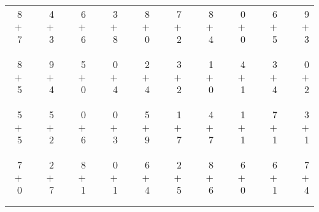 \documentclass[12pt, letterpaper]{article}
\begin{document}
\begin{tabular}{rrrrrrrrrrrrrrrrrrr}
8 & & 4 & & 6 & & 3 & & 8 & & 7 & & 8 & & 0 & & 6 & & 9\\
$+$ 7 & & $+$ 3 & & $+$ 6 & & $+$ 8 & & $+$ 0 & & $+$ 2 & & $+$ 4 & & $+$ 0 & & $+$ 5 & & $+$ 3\\
\cline{1-1} \cline{3-3} \cline{5-5} \cline{7-7} \cline{9-9} \cline{11-11} \cline{13-13} \cline{15-15} \cline{17-17} \cline{19-19} \\ \\
8 & & 9 & & 5 & & 0 & & 2 & & 3 & & 1 & & 4 & & 3 & & 0\\
$+$ 5 & & $+$ 4 & & $+$ 0 & & $+$ 4 & & $+$ 4 & & $+$ 2 & & $+$ 0 & & $+$ 1 & & $+$ 4 & & $+$ 2\\
\cline{1-1} \cline{3-3} \cline{5-5} \cline{7-7} \cline{9-9} \cline{11-11} \cline{13-13} \cline{15-15} \cline{17-17} \cline{19-19} \\ \\
5 & & 5 & & 0 & & 0 & & 5 & & 1 & & 4 & & 1 & & 7 & & 3\\
$+$ 5 & & $+$ 2 & & $+$ 6 & & $+$ 3 & & $+$ 9 & & $+$ 7 & & $+$ 7 & & $+$ 1 & & $+$ 1 & & $+$ 1\\
\cline{1-1} \cline{3-3} \cline{5-5} \cline{7-7} \cline{9-9} \cline{11-11} \cline{13-13} \cline{15-15} \cline{17-17} \cline{19-19} \\ \\
7 & & 2 & & 8 & & 0 & & 6 & & 2 & & 8 & & 6 & & 6 & & 7\\
$+$ 0 & & $+$ 7 & & $+$ 1 & & $+$ 1 & & $+$ 4 & & $+$ 5 & & $+$ 6 & & $+$ 0 & & $+$ 1 & & $+$ 4\\
\cline{1-1} \cline{3-3} \cline{5-5} \cline{7-7} \cline{9-9} \cline{11-11} \cline{13-13} \cline{15-15} \cline{17-17} \cline{19-19} \\ \\
\end{tabular}
\newpage
\end{document}
